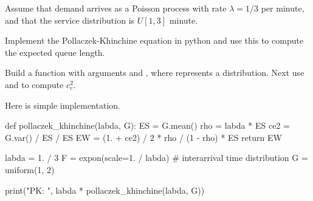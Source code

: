 Assume that demand arrives as a Poisson process with rate $\lambda=1/3$ per minute, and that the service distribution is $U[1,3]$ minute.


\begin{exercise}\label{ex:5}
  Implement the Pollaczek-Khinchine equation in python and use this to compute the expected queue length.


\begin{hint}
  Build a function with arguments  and , where  represents a distribution.
  Next use  and  to compute $c_e^2$.
\end{hint}
\begin{solution}
Here is simple implementation.
    \begin{pyverbatim}
def pollaczek_khinchine(labda, G):
    ES = G.mean()
    rho = labda * ES
    ce2 = G.var() / ES / ES
    EW = (1. + ce2) / 2 * rho / (1 - rho) * ES
    return EW


labda = 1. / 3
F = expon(scale=1. / labda)  # interarrival time distribution
G = uniform(1, 2)

print("PK: ", labda * pollaczek_khinchine(labda, G))
\end{pyverbatim}
  \end{solution}
\end{exercise}

